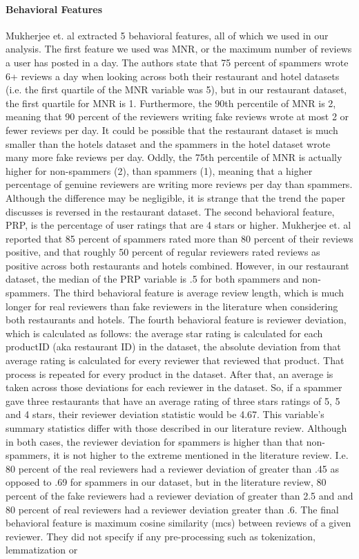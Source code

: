 \documentclass[man, floatsintext, 10pt]{apa6}
\begin{document}
\vspace{2mm}

\paragraph{Behavioral Features} Mukherjee et. al extracted 5 behavioral features, all of which we used in our analysis. The first feature we used was MNR, or the maximum number of reviews a user has posted in a day. The authors state that 75 percent of spammers wrote 6+ reviews a day when looking across both their restaurant and hotel datasets (i.e. the first quartile of the MNR variable was 5), but in our restaurant dataset, the first quartile for MNR is 1. Furthermore, the 90th percentile of MNR is 2, meaning that 90 percent of the reviewers writing fake reviews wrote at most 2 or fewer reviews per day. It could be possible that the restaurant dataset is much smaller than the hotels dataset and the spammers in the hotel dataset wrote many more fake reviews per day.  Oddly, the 75th percentile of MNR is actually higher for non-spammers (2), than spammers (1), meaning that a higher percentage of genuine reviewers are writing more reviews per day than spammers. Although the difference may be negligible, it is strange that the trend the paper discusses is reversed in the restaurant dataset. The second behavioral feature, PRP, is the percentage of user ratings that are 4 stars or higher. Mukherjee et. al reported that 85 percent of spammers rated more than 80 percent of their reviews positive, and that roughly 50 percent of regular reviewers rated reviews as positive across both restaurants and hotels combined.  However, in our restaurant dataset, the median of the PRP variable is .5 for both spammers and non-spammers. The third behavioral feature is average review length, which is much longer for real reviewers than fake reviewers in the literature when considering both restaurants and hotels.  The fourth behavioral feature is reviewer deviation, which is calculated as follows: the average star rating is calculated for each productID (aka restaurant ID) in the dataset, the absolute deviation from that average rating is calculated for every reviewer that reviewed that product. That process is repeated for every product in the dataset. After that, an average is taken across those deviations for each reviewer in the dataset. So, if a spammer gave three restaurants that have an average rating of three stars ratings of 5, 5 and 4 stars, their reviewer deviation statistic would be 4.67. This variable's summary statistics differ with those described in our literature review. Although in both cases, the reviewer deviation for spammers is higher than that non-spammers, it is not higher to the extreme  mentioned in the literature review. I.e. 80 percent of the real reviewers had a reviewer deviation of greater than .45 as opposed to .69 for spammers in our dataset, but in the literature review, 80 percent of the fake reviewers had a reviewer deviation of greater than 2.5 and and 80 percent of real reviewers had a reviewer deviation greater than .6. The final behavioral feature is maximum cosine similarity (mcs) between reviews of a given reviewer. They did not specify if any pre-processing such as tokenization, lemmatization or 
\end{document}
